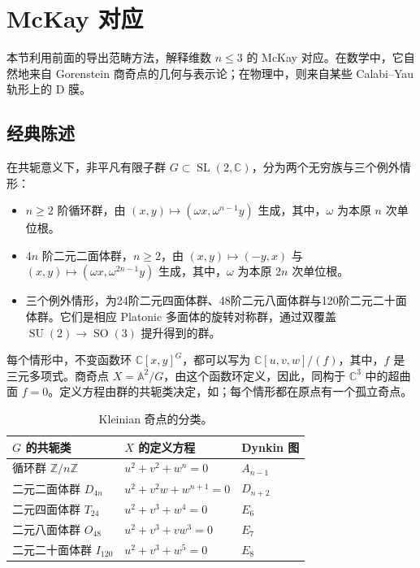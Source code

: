 \section{McKay 对应}\label{sec:4.7}

本节利用前面的导出范畴方法，解释维数 $n\le3$ 的 McKay 对应。在数学中，它自然地来自 Gorenstein 商奇点的几何与表示论；在物理中，则来自某些 Calabi--Yau 轨形上的 D 膜。

\subsection{经典陈述}\label{sec:4.7.1}

在共轭意义下，非平凡有限子群 $G\subset\operatorname{SL}(2,\mathbb{C})$，分为两个无穷族与三个例外情形：
\begin{itemize}
\item $n\ge2$ 阶循环群，由 $(x,y)\mapsto(\omega x,\omega^{n-1}y)$ 生成，其中，$\omega$ 为本原 $n$ 次单位根。
\item $4n$ 阶二元二面体群，$n\ge2$，由 $(x,y)\mapsto(-y,x)$ 与 $(x,y)\mapsto(\omega x,\omega^{2n-1}y)$ 生成，其中，$\omega$ 为本原 $2n$ 次单位根。
\item 三个例外情形，为24阶二元四面体群、48阶二元八面体群与120阶二元二十面体群。它们是相应 Platonic 多面体的旋转对称群，通过双覆盖 $\operatorname{SU}(2)\to\operatorname{SO}(3)$ 提升得到的群。
\end{itemize}

每个情形中，不变函数环 $\mathbb{C}[x,y]^G$，都可以写为 $\mathbb{C}[u,v,w]/(f)$，其中，$f$ 是三元多项式。商奇点 $X=\mathbb{A}^2/G$，由这个函数环定义，因此，同构于 $\mathbb{C}^3$ 中的超曲面 $f=0$。定义方程由群的共轭类决定，如；每个情形都在原点有一个孤立奇点。
\begin{table}[H]
\centering
\caption{Kleinian 奇点的分类。}\label{tab:4.1}
\begin{tabular}{lll}
\toprule
$G$ 的共轭类 & $X$ 的定义方程 & Dynkin 图\\
\midrule
循环群 $\mathbb{Z}/n\mathbb{Z}$ & $u^2+v^2+w^n=0$ & $A_{n-1}$\\
二元二面体群 $D_{4n}$ & $u^2+v^2w+w^{n+1}=0$ & $D_{n+2}$\\
二元四面体群 $T_{24}$ & $u^2+v^3+w^4=0$ & $E_6$\\
二元八面体群 $O_{48}$ & $u^2+v^3+vw^3=0$ & $E_7$\\
二元二十面体群 $I_{120}$ & $u^2+v^3+w^5=0$ & $E_8$\\
\bottomrule
\end{tabular}
\end{table}

